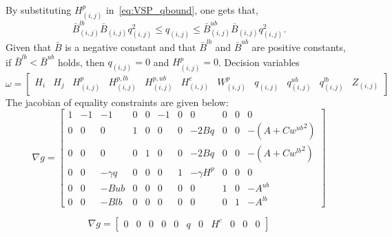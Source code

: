By substituting $H^p_{(i,j)}$ in~\eqref{eq:VSP_qbound}, one gets that,
\begin{equation}
    \bar{B}^{lb}_{(i,j)}\bar{B}_{(i,j)} q_{(i,j)}^2 \leq q_{(i,j)} \leq \bar{B}^{ub}_{(i,j)}\bar{B}_{(i,j)} q_{(i,j)}^2.
\end{equation} Given that $\bar{B}$ is a negative constant and that $\bar{B}^{lb}$ and $\bar{B}^{ub}$ are positive constants, if $\bar{B}^{lb} < \bar{B}^{ub}$ holds, then $q_{(i,j)} = 0$ and $H^p_{(i,j)}=0$. 
Decision variables
\begin{equation}
    \omega = \left[\begin{array}{ccccccccccc}
        H_i & H_j & H^p_{(i,j)} & H^{p,lb}_{(i,j)} & H^{p,ub}_{(i,j)} & H^c_{(i,j)} &W^p_{(i,j)} & q_{(i,j)} & q^{ub}_{(i,j)} & q^{lb}_ {(i,j)} & Z_{(i,j)}
    \end{array}\right]
\end{equation}
The jacobian of equality constraints are given below:
\begin{equation}
    \nabla g = \left[\begin{array}{ccccccccccc}
        1 & -1 & -1 & 0 & 0 & -1 & 0 & 0& 0 & 0 & 0  \\
        0 & 0 & 0 & 1  & 0 & 0 & 0 & -2Bq& 0 & 0 & -(A + C{w^{ub}}^2)\\
        0 & 0 & 0 & 0  & 1 & 0 & 0 & -2Bq& 0 & 0 & -(A + C{w^{lb}}^2) \\
        0 & 0 & -\gamma q & 0 & 0 & 0 & 1& -\gamma H^p & 0 & 0 & 0 \\
        0 & 0 & -Bub & 0 & 0 & 0 & 0& 0& 1 & 0 & -A^{ub} \\
        0 & 0 & -Blb & 0 & 0 & 0 & 0& 0& 0 & 1 & -A^{lb} 
    \end{array}\right]
\end{equation}

\begin{equation}
    \nabla g = \left[\begin{array}{ccccccccccc}
        0& 0 & 0 & 0 & 0 & q & 0 & H^c & 0 & 0 & 0
    \end{array}\right]
\end{equation}


